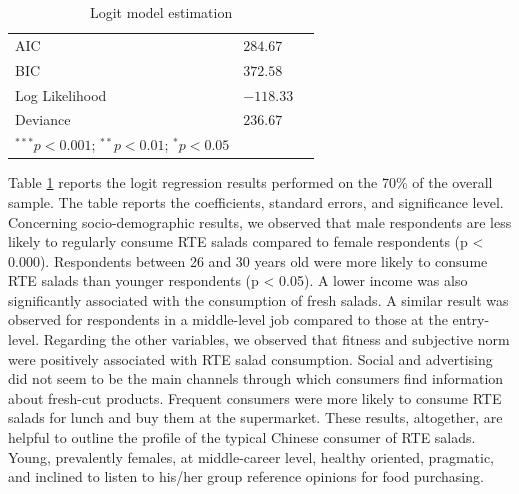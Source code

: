 \documentclass[a4,12pt]{article}
\begin{document}
\begin{table}
\begin{center}
\begin{tabular}{lcll }
AIC                      & & $284.67$      \\
BIC                      & & $372.58$      \\
Log Likelihood       &     & $-118.33$     \\
Deviance              &    & $236.67$      \\
\hline
\multicolumn{2}{l}{\scriptsize{$^{***}p<0.001$; $^{**}p<0.01$; $^{*}p<0.05$}}
\end{tabular}
\caption{Logit model estimation}
\label{table:coefficients}
\end{center}
\end{table}

Table \ref{table:coefficients} reports the logit regression results performed on the 70\% of the overall sample.  The table reports the coefficients, standard errors, and significance level. Concerning socio-demographic results, we observed that male respondents are less likely to regularly consume RTE salads compared to female respondents (p < 0.000). Respondents between 26 and 30 years old were more likely to consume RTE salads than younger respondents (p < 0.05). A lower income was also significantly associated with the consumption of fresh salads. A similar result was observed for respondents in a middle-level job compared to those at the entry-level. 
Regarding the other variables, we observed that fitness and subjective norm were positively associated with RTE salad consumption. Social and advertising did not seem to be the main channels through which consumers find information about fresh-cut products. Frequent consumers were more likely to consume RTE salads for lunch and buy them at the supermarket. 
These results, altogether, are helpful to outline the profile of the typical Chinese consumer of RTE salads. Young, prevalently females, at middle-career level, healthy oriented, pragmatic, and inclined to listen to his/her group reference opinions for food purchasing. 
\end{document}
